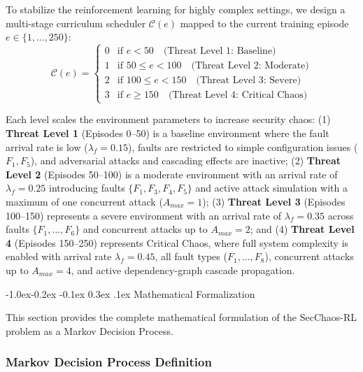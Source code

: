 \documentclass[conference,10pt]{IEEEtran}
\makeatletter
\renewcommand\subsection{\@startsection{subsection}{2}{\z@}%
	{-1.0ex\@plus -0.2ex \@minus -0.1ex}%
	{0.3ex \@plus .1ex}%
	{\normalfont\normalsize\itshape}}
\makeatother
\begin{document}
To stabilize the reinforcement learning for highly complex settings, we design a multi-stage curriculum scheduler $\mathcal{C}(e)$ mapped to the current training episode $e \in \{1, \ldots, 250\}$: 
\begin{equation}
	\mathcal{C}(e) = \begin{cases}
		0 & \text{if } e < 50 \quad \text{(Threat Level 1: Baseline)} \\
		1 & \text{if } 50 \leq e < 100 \quad \text{(Threat Level 2: Moderate)} \\
		2 & \text{if } 100 \leq e < 150 \quad \text{(Threat Level 3: Severe)} \\
		3 & \text{if } e \geq 150 \quad \text{(Threat Level 4: Critical Chaos)}
	\end{cases}
\end{equation}

Each level scales the environment parameters to increase security chaos: (1) \textbf{Threat Level 1} (Episodes 0--50) is a baseline environment where the fault arrival rate is low ($\lambda_f = 0.15$), faults are restricted to simple configuration issues ($F_1, F_5$), and adversarial attacks and cascading effects are inactive; (2) \textbf{Threat Level 2} (Episodes 50--100) is a moderate environment with an arrival rate of $\lambda_f = 0.25$ introducing faults $\{F_1, F_3, F_4, F_5\}$ and active attack simulation with a maximum of one concurrent attack ($A_{max} = 1$); (3) \textbf{Threat Level 3} (Episodes 100--150) represents a severe environment with an arrival rate of $\lambda_f = 0.35$ across faults $\{F_1, \dots, F_6\}$ and concurrent attacks up to $A_{max} = 2$; and (4) \textbf{Threat Level 4} (Episodes 150--250) represents Critical Chaos, where full system complexity is enabled with arrival rate $\lambda_f = 0.45$, all fault types ($F_1, \dots, F_8$), concurrent attacks up to $A_{max} = 4$, and active dependency-graph cascade propagation.

\subsection{Mathematical Formalization}

This section provides the complete mathematical formulation of the SecChaos-RL problem as a Markov Decision Process.

\subsubsection{Markov Decision Process Definition}
\end{document}

